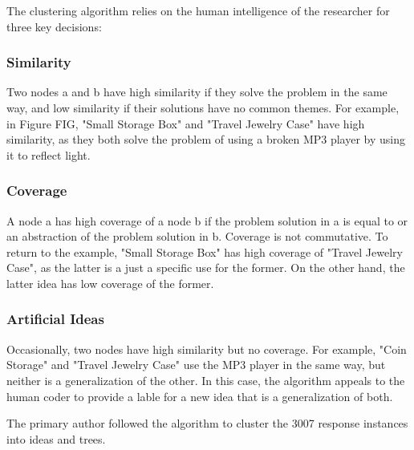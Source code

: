 The clustering algorithm relies on the human intelligence of the researcher for three key decisions:

\subsubsection{Similarity}
Two nodes a and b have high similarity if they solve the problem in the same way, and low similarity if their solutions have no common themes. For example, in Figure FIG, "Small Storage Box" and "Travel Jewelry Case" have high similarity, as they both solve the problem of using a broken MP3 player by using it to reflect light.

\subsubsection{Coverage}
A node a has high coverage of a node b if the problem solution in a is equal to or an abstraction of the problem solution in b. Coverage is not commutative. To return to the example, "Small Storage Box" has high coverage of "Travel Jewelry Case", as the latter is a just a specific use for the former. On the other hand, the latter idea has low coverage of the former.

\subsubsection{Artificial Ideas}
Occasionally, two nodes have high similarity but no coverage. For example, "Coin Storage" and "Travel Jewelry Case" use the MP3 player in the same way, but neither is a generalization of the other. In this case, the algorithm appeals to the human coder to provide a lable for a new idea that is a generalization of both.

The primary author followed the algorithm to cluster the 3007 response instances into ideas and trees.
